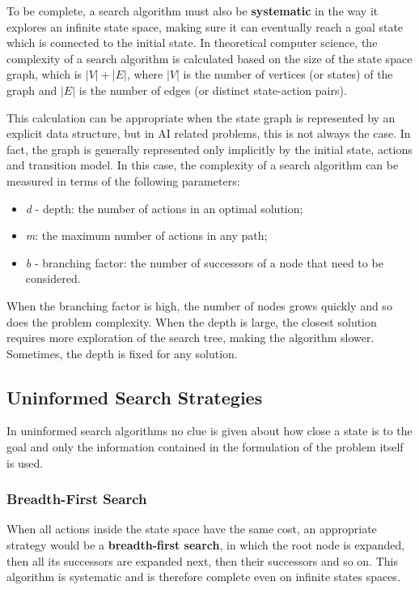 \documentclass{article}
\begin{document}
To be complete, a search algorithm must also be \textbf{systematic} in the way it explores an infinite state space, making sure it can eventually reach a goal state which is connected to the initial state. In theoretical computer science, the complexity of a search algorithm is calculated based on the size of the state space graph, which is $|V|+|E|$, where $|V|$ is the number of vertices (or states) of the graph and $|E|$ is the number of edges (or distinct state-action pairs). 

This calculation can be appropriate when the state graph is represented by an explicit data structure, but in AI related problems, this is not always the case. In fact, the graph is generally represented only implicitly by the initial state, actions and transition model. In this case, the complexity of a search algorithm can be measured in terms of the following parameters:
\begin{itemize}
    \item \textit{d} - depth: the number of actions in an optimal solution;
    \item \textit{m}: the maximum number of actions in any path;
    \item \textit{b} - branching factor: the number of successors of a node that need to be considered. 
\end{itemize}

When the branching factor is high, the number of nodes grows quickly and so does the problem complexity. When the depth is large, the closest solution requires more exploration of the search tree, making the algorithm slower. Sometimes, the depth is fixed for any solution.

\subsection{Uninformed Search Strategies}
In uninformed search algorithms no clue is given about how close a state is to the goal and only the information contained in the formulation of the problem itself is used.

\subsubsection{Breadth-First Search}
When all actions inside the state space have the same cost, an appropriate strategy would be a \textbf{breadth-first search}, in which the root node is expanded, then all its successors are expanded next, then their successors and so on. This algorithm is systematic and is therefore complete even on infinite states spaces.
\end{document}
